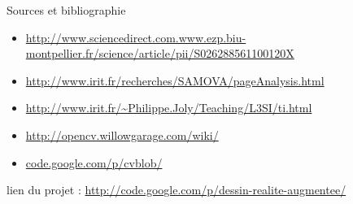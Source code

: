 \documentclass{beamer}
\begin{document}
	\begin{frame}{Sources et bibliographie}
   
		\begin{itemize}
		\item{\url{http://www.sciencedirect.com.www.ezp.biu-montpellier.fr/science/article/pii/S026288561100120X}}
		\item{\url{http://www.irit.fr/recherches/SAMOVA/pageAnalysis.html}}
		\item{\url{http://www.irit.fr/~Philippe.Joly/Teaching/L3SI/ti.html}}
		\item{\url{http://opencv.willowgarage.com/wiki/}}
		\item{\url{code.google.com/p/cvblob/} }
		\end{itemize}
		lien du projet : \url{http://code.google.com/p/dessin-realite-augmentee/}
	\end{frame}
\end{document}
